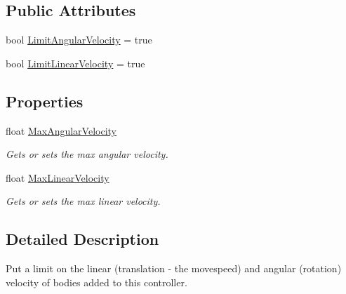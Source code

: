 \subsection*{Public Attributes}
\begin{DoxyCompactItemize}
\item 
bool \hyperlink{class_farseer_physics_1_1_controllers_1_1_velocity_limit_controller_a7bfea35336215642dca269444852e983}{Limit\+Angular\+Velocity} = true
\item 
bool \hyperlink{class_farseer_physics_1_1_controllers_1_1_velocity_limit_controller_acdba7a259cc606675f3e356e44961ea6}{Limit\+Linear\+Velocity} = true
\end{DoxyCompactItemize}
\subsection*{Properties}
\begin{DoxyCompactItemize}
\item 
float \hyperlink{class_farseer_physics_1_1_controllers_1_1_velocity_limit_controller_acb4b2be9435eca10f3505474351095fe}{Max\+Angular\+Velocity}
\begin{DoxyCompactList}\small\item\em Gets or sets the max angular velocity. \end{DoxyCompactList}\item 
float \hyperlink{class_farseer_physics_1_1_controllers_1_1_velocity_limit_controller_a6d71700cce3bda3d5dc594d335be2d9f}{Max\+Linear\+Velocity}
\begin{DoxyCompactList}\small\item\em Gets or sets the max linear velocity. \end{DoxyCompactList}\end{DoxyCompactItemize}


\subsection{Detailed Description}
Put a limit on the linear (translation -\/ the movespeed) and angular (rotation) velocity of bodies added to this controller. 



